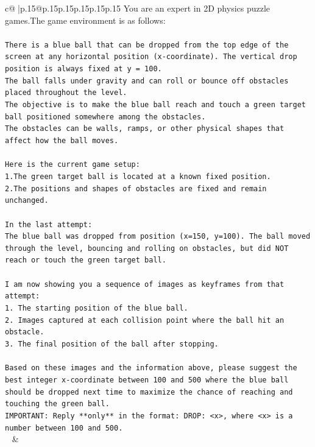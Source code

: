 \documentclass{article}
\begin{document}
{\begin{supertabular}{c@{$\;$}|p{.15\linewidth}@{}p{.15\linewidth}p{.15\linewidth}p{.15\linewidth}p{.15\linewidth}p{.15\linewidth}}
{{{	 You are an expert in 2D physics puzzle games.The game environment is as follows:\\ \tt \\ \tt There is a blue ball that can be dropped from the top edge of the screen at any horizontal position (x-coordinate). The vertical drop position is always fixed at y = 100.\\ \tt The ball falls under gravity and can roll or bounce off obstacles placed throughout the level.\\ \tt The objective is to make the blue ball reach and touch a green target ball positioned somewhere among the obstacles.\\ \tt The obstacles can be walls, ramps, or other physical shapes that affect how the ball moves.\\ \tt \\ \tt Here is the current game setup:\\ \tt 1.The green target ball is located at a known fixed position.\\ \tt 2.The positions and shapes of obstacles are fixed and remain unchanged.\\ \tt \\ \tt In the last attempt:\\ \tt The blue ball was dropped from position (x=150, y=100). The ball moved through the level, bouncing and rolling on obstacles, but did NOT reach or touch the green target ball.\\ \tt \\ \tt I am now showing you a sequence of images as keyframes from that attempt:\\ \tt 1. The starting position of the blue ball.\\ \tt 2. Images captured at each collision point where the ball hit an obstacle.\\ \tt 3. The final position of the ball after stopping.\\ \tt \\ \tt Based on these images and the information above, please suggest the best integer x-coordinate between 100 and 500 where the blue ball should be dropped next time to maximize the chance of reaching and touching the green ball.\\ \tt IMPORTANT: Reply **only** in the format: DROP: <x>, where <x> is a number between 100 and 500.\\ \tt  
	  } 
	   } 
	   } 
	 & \\ 
 

    \theutterance {}  


\end{supertabular}}
\end{document}
